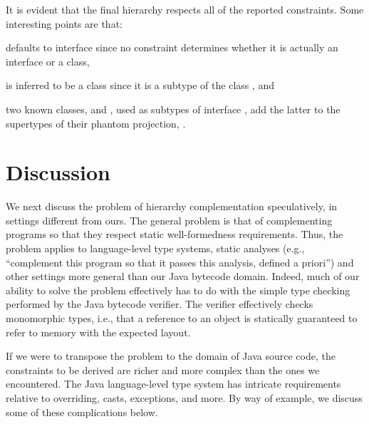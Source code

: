It is evident that the final hierarchy respects all of the reported
constraints. Some interesting points are that:
\begin{inparaenum}[(i)]
\item {} defaults to interface since no
  constraint determines whether it is actually an interface or a
  class,
\item {} is inferred to be a
  class since it is a subtype of the class , and
\item two known classes,
   and
  , used as subtypes of
  interface , add the latter to
  the supertypes of their phantom projection,
  .
\end{inparaenum}



\section{Discussion}
\label{hiercomp/sect/discussion}

We next discuss the problem of hierarchy complementation speculatively,
in settings different from ours. The general problem is that of
complementing programs so that they respect static well-formedness
requirements. Thus, the problem applies to language-level type
systems, static analyses (e.g., ``complement this program so that it
passes this analysis, defined a priori'') and other settings more
general than our Java bytecode domain. Indeed, much of our ability to
solve the problem effectively has to do with the simple type
checking performed by the Java bytecode verifier. The verifier
effectively checks monomorphic types, i.e., that a reference to an
object is statically guaranteed to refer to memory with the expected
layout.

If we were to transpose the problem to the domain of Java source code,
the constraints to be derived are richer and more complex than
the ones we encountered.
The Java language-level type system has intricate requirements
relative to overriding, casts, exceptions, and more.  By way of
example, we discuss some of these complications below.

